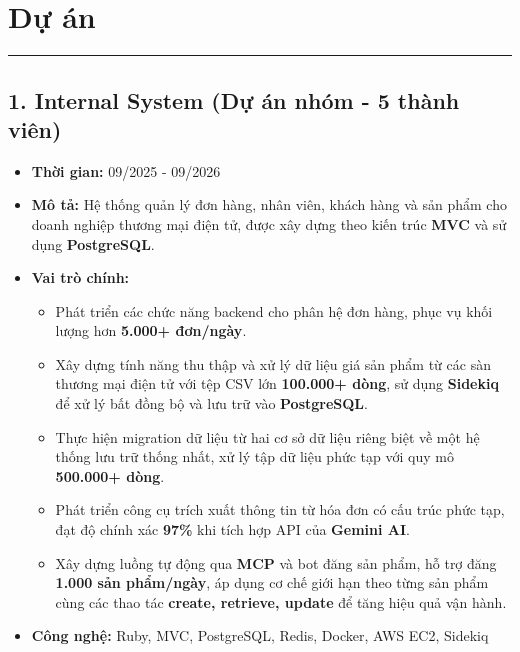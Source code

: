 \documentclass[a4paper,10pt]{article}
\begin{document}
\section{Dự án}
\vspace{-10pt}
\noindent\rule{\linewidth}{0.5pt}

\subsection*{1. Internal System \hfill \small (Dự án nhóm - 5 thành viên)}
\begin{itemize}
    \item \textbf{Thời gian:} 09/2025 - 09/2026
    \item \textbf{Mô tả:} Hệ thống quản lý đơn hàng, nhân viên, khách hàng và sản phẩm cho doanh nghiệp thương mại điện tử, được xây dựng theo kiến trúc \textbf{MVC} và sử dụng \textbf{PostgreSQL}.
    \item \textbf{Vai trò chính:}
    \begin{itemize}
        \item Phát triển các chức năng backend cho phân hệ đơn hàng, phục vụ khối lượng hơn \textbf{5.000+ đơn/ngày}.
        \item Xây dựng tính năng thu thập và xử lý dữ liệu giá sản phẩm từ các sàn thương mại điện tử với tệp CSV lớn \textbf{100.000+ dòng}, sử dụng \textbf{Sidekiq} để xử lý bất đồng bộ và lưu trữ vào \textbf{PostgreSQL}.
        \item Thực hiện migration dữ liệu từ hai cơ sở dữ liệu riêng biệt về một hệ thống lưu trữ thống nhất, xử lý tập dữ liệu phức tạp với quy mô \textbf{500.000+ dòng}.
        \item Phát triển công cụ trích xuất thông tin từ hóa đơn có cấu trúc phức tạp, đạt độ chính xác \textbf{97\%} khi tích hợp API của \textbf{Gemini AI}.
        \item Xây dựng luồng tự động qua \textbf{MCP} và bot đăng sản phẩm, hỗ trợ đăng \textbf{1.000 sản phẩm/ngày}, áp dụng cơ chế giới hạn theo từng sản phẩm cùng các thao tác \textbf{create, retrieve, update} để tăng hiệu quả vận hành.
    \end{itemize}
    \item \textbf{Công nghệ:} Ruby, MVC, PostgreSQL, Redis, Docker, AWS EC2, Sidekiq
\end{itemize}
\end{document}
